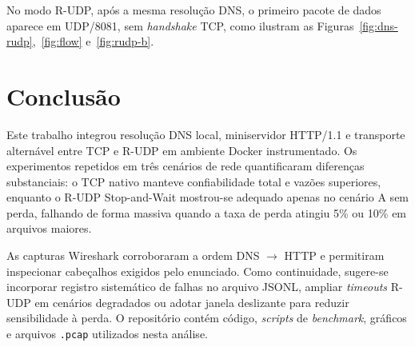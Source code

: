 \documentclass[12pt]{article}
\begin{document}
No modo R-UDP, após a mesma resolução DNS, o primeiro pacote de dados aparece
em UDP/8081, sem \emph{handshake} TCP, como ilustram as
Figuras~\ref{fig:dns-rudp},~\ref{fig:flow} e~\ref{fig:rudp-b}.

\section{Conclusão}

Este trabalho integrou resolução DNS local, miniservidor HTTP/1.1 e transporte
alternável entre TCP e R-UDP em ambiente Docker instrumentado. Os experimentos
repetidos em três cenários de rede quantificaram diferenças substanciais: o TCP
nativo manteve confiabilidade total e vazões superiores, enquanto o R-UDP
Stop-and-Wait mostrou-se adequado apenas no cenário A sem perda, falhando de
forma massiva quando a taxa de perda atingiu 5\% ou 10\% em arquivos maiores.

As capturas Wireshark corroboraram a ordem DNS $\rightarrow$ HTTP e permitiram
inspecionar cabeçalhos exigidos pelo enunciado. Como continuidade, sugere-se
incorporar registro sistemático de falhas no arquivo JSONL, ampliar \emph{timeouts}
R-UDP em cenários degradados ou adotar janela deslizante para reduzir sensibilidade
à perda. O repositório contém código, \emph{scripts} de \emph{benchmark}, gráficos
e arquivos \texttt{.pcap} utilizados nesta análise.



\end{document}
